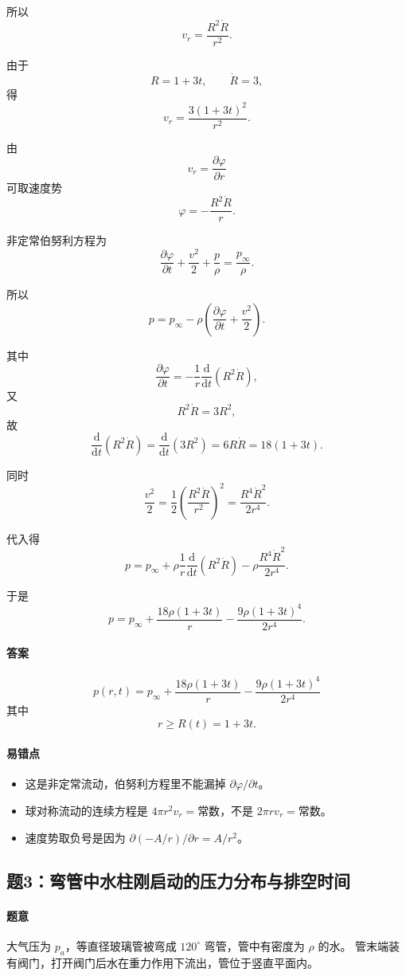 \documentclass[12pt,a4paper]{ctexart}
\newcommand{\dd}{\mathrm d}
\newcommand{\pa}{p_a}
\newcommand{\pinf}{p_\infty}
\begin{document}
所以
\[
v_r=\frac{R^2\dot R}{r^2}.
\]

由于
\[
R=1+3t,\qquad \dot R=3,
\]
得
\[
v_r=\frac{3(1+3t)^2}{r^2}.
\]

由
\[
v_r=\frac{\partial\varphi}{\partial r}
\]
可取速度势
\[
\varphi=-\frac{R^2\dot R}{r}.
\]

非定常伯努利方程为
\[
\frac{\partial \varphi}{\partial t}
+\frac{v^2}{2}
+\frac p\rho
=\frac{\pinf}{\rho}.
\]

所以
\[
p=\pinf-\rho
\left(
\frac{\partial \varphi}{\partial t}
+\frac{v^2}{2}
\right).
\]

其中
\[
\frac{\partial \varphi}{\partial t}
=-\frac{1}{r}\frac{\dd}{\dd t}(R^2\dot R),
\]
又
\[
R^2\dot R=3R^2,
\]
故
\[
\frac{\dd}{\dd t}(R^2\dot R)
=\frac{\dd}{\dd t}(3R^2)
=6R\dot R
=18(1+3t).
\]

同时
\[
\frac{v^2}{2}
=\frac12\left(\frac{R^2\dot R}{r^2}\right)^2
=\frac{R^4\dot R^2}{2r^4}.
\]

代入得
\[
p=\pinf
+\rho\frac{1}{r}\frac{\dd}{\dd t}(R^2\dot R)
-\rho\frac{R^4\dot R^2}{2r^4}.
\]

于是
\[
p
=\pinf
+\frac{18\rho(1+3t)}{r}
-\frac{9\rho(1+3t)^4}{2r^4}.
\]

\paragraph{答案}
\[
\boxed{
p(r,t)=
\pinf
+\frac{18\rho(1+3t)}{r}
-\frac{9\rho(1+3t)^4}{2r^4}
}
\]
其中
\[
r\ge R(t)=1+3t.
\]

\paragraph{易错点}
\begin{itemize}
  \item 这是非定常流动，伯努利方程里不能漏掉 $\partial\varphi/\partial t$。
  \item 球对称流动的连续方程是 $4\pi r^2 v_r=\text{常数}$，不是 $2\pi r v_r=\text{常数}$。
  \item 速度势取负号是因为 $\partial(-A/r)/\partial r=A/r^2$。
\end{itemize}

\subsection*{题3：弯管中水柱刚启动的压力分布与排空时间}

\paragraph{题意}
大气压为 $\pa$，等直径玻璃管被弯成 $120^\circ$ 弯管，管中有密度为 $\rho$ 的水。
管末端装有阀门，打开阀门后水在重力作用下流出，管位于竖直平面内。
\end{document}
